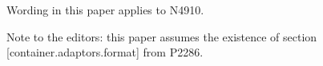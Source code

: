 
% 

Wording in this paper applies to N4910.

Note to the editors: this paper assumes the existence of section
[container.adaptors.format] from P2286.

\markboth{\contentsname}{}

\makeatletter
\renewcommand\@pnumwidth{2.5em}
\makeatother

\tableofcontents
\setcounter{tocdepth}{5}

%
